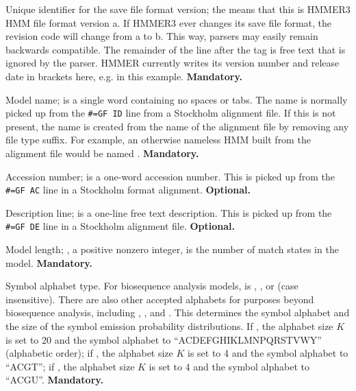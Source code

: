 \begin{wideitem}

\item [\emprog{HMMER3/a}] Unique identifier for the save file format
version; the  means that this is HMMER3 HMM file format
version a. If HMMER3 ever changes its save file format, the revision
code will change from a to b. This way, parsers may easily remain
backwards compatible. The remainder of the line after the
 tag is free text that is ignored by the parser. HMMER
currently writes its version number and release date in brackets here,
e.g.  in this
example. \textbf{Mandatory.}

\item [\emprog{NAME <s>}] Model name;  is a single word
containing no spaces or tabs. The name is normally picked up from the
\verb+#=GF ID+ line from a Stockholm alignment file.  If this is not
present, the name is created from the name of the alignment file by
removing any file type suffix. For example, an otherwise nameless HMM
built from the alignment file  would be named
.  \textbf{Mandatory.}

\item [\emprog{ACC <s>}] Accession number;  is a one-word
accession number. This is picked up from the \verb+#=GF AC+ line in a
Stockholm format alignment. \textbf{Optional.}

\item [\emprog{DESC <s>}] Description line;  is a one-line
free text description. This is picked up from the \verb+#=GF DE+ line
in a Stockholm alignment file. \textbf{Optional.}

\item [\emprog{LENG <d>}] Model length; , a positive nonzero
integer, is the number of match states in the model.
\textbf{Mandatory.}

\item [\emprog{ALPH <s>}] Symbol alphabet type. For biosequence
analysis models,  is , , or 
(case insensitive). There are also other accepted alphabets for
purposes beyond biosequence analysis, including ,
, and . This determines the symbol alphabet
and the size of the symbol emission probability distributions.  If
, the alphabet size $K$ is set to 20 and the symbol
alphabet to ``ACDEFGHIKLMNPQRSTVWY'' (alphabetic order); if
, the alphabet size $K$ is set to 4 and the symbol alphabet
to ``ACGT''; if , the alphabet size $K$ is set to 4 and the
symbol alphabet to ``ACGU''. \textbf{Mandatory.}


\end{wideitem}
